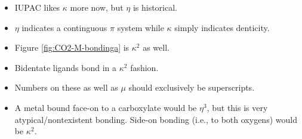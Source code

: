 \documentclass[../notes.tex]{subfiles}
\begin{document}
\begin{itemize}
\begin{itemize}
        \item IUPAC likes $\kappa$ more now, but $\eta$ is historical.
        \item $\eta$ indicates a continguous $\pi$ system while $\kappa$ simply indicates denticity.
        \item Figure \ref{fig:CO2-M-bondinga} is $\kappa^2$ as well.
        \item Bidentate ligands bond in a $\kappa^2$ fashion.
        \item Numbers on these as well as $\mu$ should exclusively be superscripts.
        \item A metal bound face-on to a carboxylate would be $\eta^3$, but this is very atypical/nontexistent bonding. Side-on bonding (i.e., to both oxygens) would be $\kappa^2$.
    \end{itemize}
\end{itemize}
\end{document}
